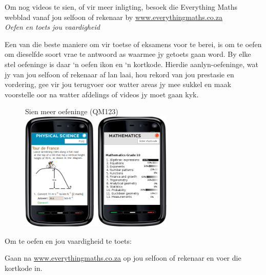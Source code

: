 \newpage
\thispagestyle{empty}
{

Om nog videos te sien, of vir meer inligting, besoek die Everything Maths webblad vanaf jou selfoon of rekenaar by \underline{www.everythingmaths.co.za}  
\vspace*{1cm}
\\
{\normalfont\sffamily\fontsize{22}\normalfont\itshape Oefen en toets jou vaardigheid} \par


Een van die beste maniere om vir toetse of eksamens voor te berei, is om te oefen om dieselfde soort vrae te antwoord as waarmee jy getoets gaan word. By elke stel oefeninge is daar ‘n oefen ikon en ‘n kortkode. Hierdie aanlyn-oefeninge, wat jy van jou selfoon of rekenaar af lan laai, hou rekord van jou prestasie en vordering, gee vir jou terugvoer oor watter areas jy mee sukkel en maak voorstelle oor na watter afdelings of videos jy moet gaan kyk.


\begin{figure}[h]
\begin{center}
Sien meer oefeninge   (QM123)\\ 
\includegraphics[width=0.65\textwidth]{title_images/practicephones.png}
\end{center}
\end{figure}
\par


Om te oefen en jou vaardigheid te toets:\par

Gaan na \underline{www.everythingmaths.co.za} op jou selfoon of rekenaar en voer die kortkode in.\partykeer
\vspace*{1cm}

}
